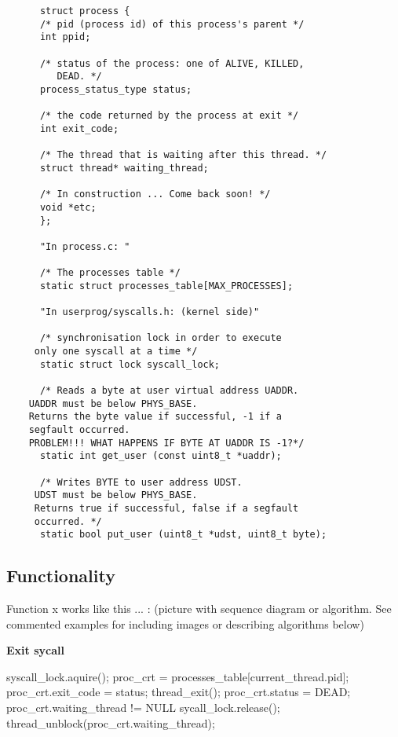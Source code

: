 {\begin{lstlisting}
      struct process {
	  /* pid (process id) of this process's parent */
	  int ppid;				
	  
	  /* status of the process: one of ALIVE, KILLED, 
	     DEAD. */
	  process_status_type status;
      
	  /* the code returned by the process at exit */
	  int exit_code;

	  /* The thread that is waiting after this thread. */
	  struct thread* waiting_thread;

	  /* In construction ... Come back soon! */
	  void *etc;
      };

      "In process.c: "

      /* The processes table */
      static struct processes_table[MAX_PROCESSES];

      "In userprog/syscalls.h: (kernel side)"
      
      /* synchronisation lock in order to execute
	 only one syscall at a time */
      static struct lock syscall_lock;

      /* Reads a byte at user virtual address UADDR.
	UADDR must be below PHYS_BASE.
	Returns the byte value if successful, -1 if a 
	segfault occurred. 
	PROBLEM!!! WHAT HAPPENS IF BYTE AT UADDR IS -1?*/
      static int get_user (const uint8_t *uaddr);

      /* Writes BYTE to user address UDST.
	 UDST must be below PHYS_BASE.
	 Returns true if successful, false if a segfault 
	 occurred. */
      static bool put_user (uint8_t *udst, uint8_t byte);

    \end{lstlisting}


    \subsection{Functionality}

	Function x works like this ... : (picture with sequence diagram or algorithm. See commented examples for including images or describing algorithms below)

	\textbf{Exit sycall}
	  \begin{program}
	    syscall\_lock.aquire();
	    proc\_crt = processes\_table[current\_thread.pid];
	    proc\_crt.exit\_code = status;
	    thread\_exit();
	    proc\_crt.status = DEAD;
	    \IF proc\_crt.waiting\_thread != NULL 
	      \THEN sycall\_lock.release(); 
	      thread\_unblock(proc\_crt.waiting_thread); 
	    \FI
	  \end{program}


}

